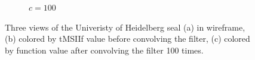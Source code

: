 \begin{figure}[ht]
\begin{subfigure}[b]{0.32\linewidth}
		\caption{$c=100$}\label{fig:unisiegel.c}
	\end{subfigure}
	\caption[Three views of the Univeristy of Heidelberg Seal]{Three views of the Univeristy of Heidelberg seal (a) in wireframe, (b) colored by \gls{tMSIIf} value before convolving the filter, (c) colored by function value after convolving the filter 100 times.}
	\label{fig:unisiegel}
\end{figure}
